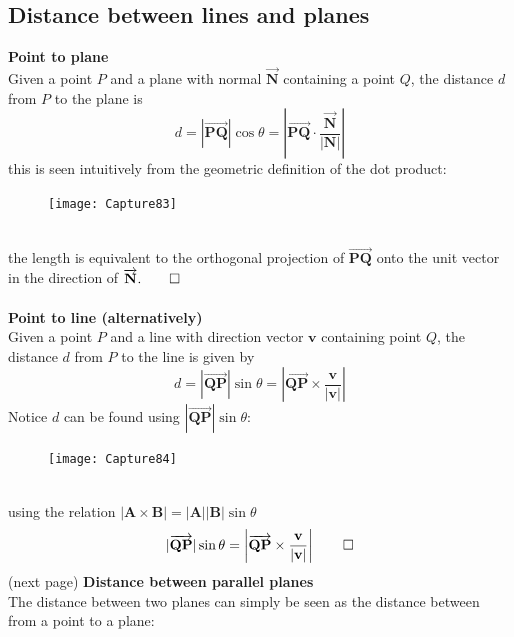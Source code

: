 \documentclass{report}
\begin{document}
\subsection{Distance between lines and planes} %
\textbf{Point to plane}\\
Given a point $P$ and a plane with normal $\overrightarrow{\mathbf{N}}$ containing a point $Q$,
the distance $d$ from $P$ to the plane is 
\begin{equation*}
d=|\overrightarrow{\mathbf{PQ}}|\cos\theta
=\left|\overrightarrow{\mathbf{PQ}}\cdot
\frac{\overrightarrow{\mathbf{N}}}{|\mathbf{N}|}\right|
\end{equation*}
this is seen intuitively from the geometric definition of the dot product:
\begin{figure}[h]
\texttt{[image: Capture83]}\\
\centering
\end{figure}\\
the length is equivalent to the orthogonal projection of $\overrightarrow{\mathbf{PQ}}$ onto
the unit vector in the direction of $\overrightarrow{\mathbf{N}}.\qed$\\
\vspace{1mm}\\
\textbf{Point to line (alternatively)}\\
Given a point $P$ and a line with direction vector $\mathbf{v}$ containing point $Q$, the 
distance $d$ from $P$ to the line is given by
\begin{equation*}
d=|\overrightarrow{\mathbf{QP}}|\sin\theta
=\left|\overrightarrow{\mathbf{QP}}\times\frac{\mathbf{v}}{|\mathbf{v}|}\right|
\end{equation*}
Notice $d$ can be found using $|\overrightarrow{\mathbf{QP}}|\sin\theta$:
\begin{figure}[h]
\texttt{[image: Capture84]}\\
\centering
\end{figure}\\
using the relation $|\mathbf{A\times B}|=\mathbf{|A||B|}\sin\theta$
\begin{equation*}
|\overrightarrow{\mathbf{QP}}|\sin\theta
=\left|\overrightarrow{\mathbf{QP}}\times\frac{\mathbf{v}}{|\mathbf{v}|}\right|\qed
\end{equation*}
(next page)
\newpage
\noindent\textbf{Distance between parallel planes}\\
The distance between two planes can simply be seen as the distance between from a point
to a plane:\\
\end{document}
